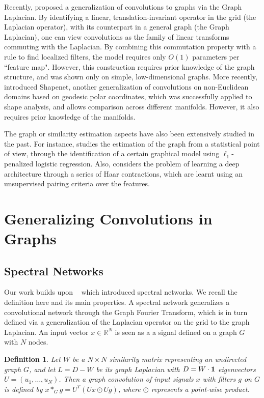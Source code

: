\documentclass{article} %
\newtheorem{graphconv}{Definition}
\begin{document}
Recently, \cite{spectralnet2013} proposed a generalization of convolutions to graphs via the Graph Laplacian. By identifying a linear, translation-invariant operator in the grid (the Laplacian operator), with its counterpart in a general graph (the Graph Laplacian), one can view convolutions as the family of linear transforms commuting with the Laplacian. By combining this commutation property with a rule to find localized filters, the model requires only $O(1)$ parameters per ``feature map". However, this construction requires prior knowledge of the graph structure, and was shown only on simple, low-dimensional graphs. More recently, \cite{DBLP:journals/corr/MasciBBV15} introduced Shapenet, another generalization of convolutions on non-Euclidean domains based on geodesic polar coordinates, which was successfully applied to shape analysis, and allows comparison across different manifolds. However, it also requires prior knowledge of the manifolds. 

The graph or similarity estimation aspects have also been extensively studied in the past. For instance, \cite{ravikumar2010high} studies the estimation of the graph from a statistical point of view, through the identification of a certain graphical model using $\ell_1$-penalized logistic regression. Also, \cite{chen2014unsupervised} considers the problem of learning a deep architecture through a series of Haar contractions, which are learnt using an unsupervised pairing criteria over the features.

\section{Generalizing Convolutions in Graphs }
\label{spectralsect}
\subsection{Spectral Networks}

Our work builds upon ~\cite{spectralnet2013} which introduced spectral networks. We recall the definition here and its main properties.
A spectral network generalizes a convolutional network through the Graph Fourier Transform, which is in turn defined via a generalization of the Laplacian operator on the grid to the graph Laplacian. An input vector $x \in \mathbb{R}^N$ is seen as a a signal defined on a graph $G$ with $N$ nodes. 
\begin{graphconv}
 Let $W$ be a $N \times N$ similarity matrix representing an undirected graph $G$, and let $L= D - W$ be its graph Laplacian with $D=W\cdot {\bf 1}$ eigenvectors $U=(u_1,\dots,u_N)$. Then a \textit{graph convolution} of input signals $x$ with filters $g$ on $G$ is defined by $x \ast_G g = U^T \left( Ux \odot Ug \right)$, where $\odot$ represents a point-wise product. 
\end{graphconv}
\end{document}
